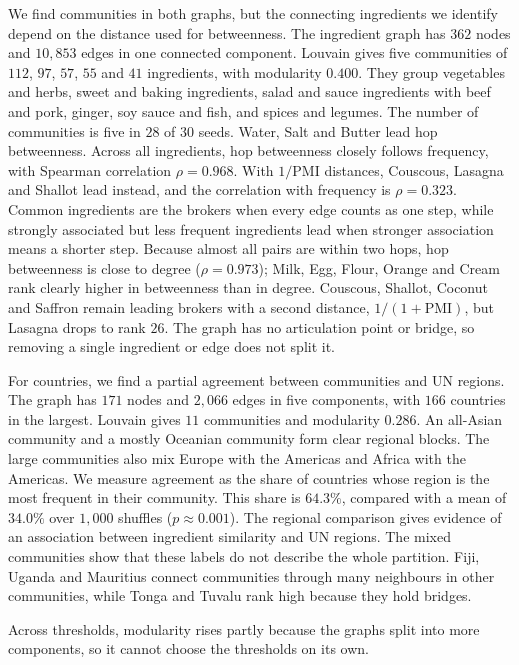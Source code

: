 We find communities in both graphs, but the connecting ingredients we
identify depend on the distance used for betweenness. The ingredient
graph has $362$ nodes and $10{,}853$ edges in one connected component.
Louvain gives five communities of $112$, $97$, $57$, $55$ and $41$
ingredients, with modularity $0.400$. They group vegetables and herbs,
sweet and baking ingredients, salad and sauce ingredients with beef and
pork, ginger, soy sauce and fish, and spices and legumes. The number of
communities is five in $28$ of $30$ seeds. Water, Salt and Butter lead hop
betweenness. Across all ingredients, hop betweenness closely follows
frequency, with Spearman correlation $\rho=0.968$. With $1/\mathrm{PMI}$
distances, Couscous, Lasagna and Shallot lead instead, and the correlation
with frequency is $\rho=0.323$. Common ingredients are the brokers when
every edge counts as one step, while strongly associated but less
frequent ingredients lead when stronger association means a shorter
step. Because almost all pairs are within two hops, hop betweenness is
close to degree ($\rho=0.973$); Milk, Egg, Flour, Orange and Cream rank
clearly higher in betweenness than in degree. Couscous, Shallot, Coconut
and Saffron remain leading brokers with a second distance,
$1/(1+\mathrm{PMI})$, but Lasagna drops to rank $26$. The graph has no
articulation point or bridge, so removing a single ingredient or edge
does not split it.

For countries, we find a partial agreement between communities and UN
regions. The graph has $171$ nodes and $2{,}066$ edges in five components,
with $166$ countries in the largest. Louvain gives $11$ communities and
modularity $0.286$. An all-Asian community and a mostly Oceanian community
form clear regional blocks. The large communities also mix Europe with
the Americas and Africa with the Americas. We measure agreement as the
share of countries whose region is the most frequent in their community.
This share is $64.3\%$, compared with a mean of $34.0\%$ over $1{,}000$
shuffles ($p\approx0.001$). The regional comparison gives evidence of an
association between ingredient similarity and UN regions. The mixed
communities show that these labels do not describe the whole partition.
Fiji, Uganda and Mauritius connect communities through many neighbours
in other communities, while Tonga and Tuvalu rank high because they hold
bridges.

Across thresholds, modularity rises partly because the graphs split
into more components, so it cannot choose the thresholds on its own.

